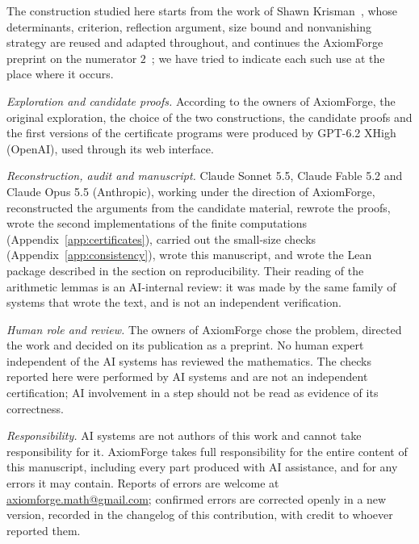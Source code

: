 
The construction studied here starts from the work of Shawn Krisman~\cite{Krisman2026chi2,
Krisman2026chi2small}, whose determinants, criterion, reflection argument, size bound and
nonvanishing strategy are reused and adapted throughout, and continues the AxiomForge preprint on the
numerator $2$~\cite{AxiomForge2026numeratorTwo}; we have tried to indicate each such use at the place
where it occurs.


\emph{Exploration and candidate proofs.} According to the owners of AxiomForge, the original
exploration, the choice of the two constructions, the candidate proofs and the first versions
of the certificate programs were produced by GPT-6.2 XHigh (OpenAI), used through its web
interface.

\emph{Reconstruction, audit and manuscript.} Claude Sonnet 5.5, Claude Fable 5.2 and Claude Opus
5.5 (Anthropic), working under the direction of AxiomForge, reconstructed the arguments from the
candidate material, rewrote the proofs, wrote the second implementations of the finite computations
(Appendix~\ref{app:certificates}), carried out the small-size checks (Appendix~\ref{app:consistency}),
wrote this manuscript, and wrote the Lean package described in the section on reproducibility.
Their reading of the arithmetic lemmas is an AI-internal review: it was made by the same family of
systems that wrote the text, and is not an independent verification.

\emph{Human role and review.} The owners of AxiomForge chose the problem, directed the work and
decided on its publication as a preprint. No human expert independent of the AI systems has
reviewed the mathematics. The checks reported here were performed by AI systems and are not an
independent certification; AI involvement in a step should not be read as evidence of its
correctness.

\emph{Responsibility.} AI systems are not authors of this work and cannot take responsibility
for it. AxiomForge takes full responsibility for the entire content of this manuscript,
including every part produced with AI assistance, and for any errors it may contain. Reports
of errors are welcome at \href{mailto:axiomforge.math@gmail.com}{axiomforge.math@gmail.com};
confirmed errors are corrected openly in a new version, recorded in the changelog of this
contribution, with credit to whoever reported them.
